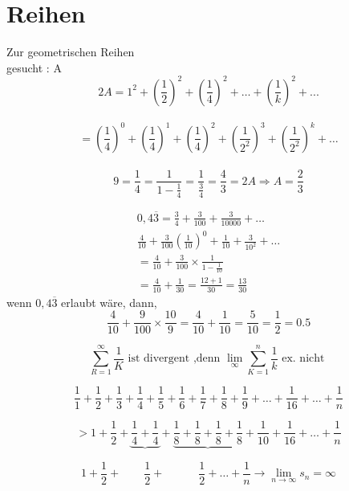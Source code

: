 


\section{Reihen}
\begin{example}{Zur geometrischen Reihen}\\
	gesucht : A
	\[2A = 1^2 + (\frac{1}{2})^2+(\frac{1}{4})^2 + \dots + (\frac{1}{k})^2 + ... \]\\
	\[= (\frac{1}{4})^0 + (\frac{1}{4})^1+ (\frac{1}{4})^2+(\frac{1}{2^2})^3+(\frac{1}{2^2})^k+ \dots \]\\
	\[9 = \frac{1}{4} = \frac{1}{1- \frac{1}{4}} = \frac{1}{\frac{3}{4}} = \frac{4}{3}= 2A \Rightarrow A = \frac{2}{3}\] 
\end{example}

\begin{example}
	\begin{equation}
	\begin{aligned}
	0,4 \overline{3} = \frac{3}{4} + \frac{3}{100} + \frac{3}{10000}+ \dots \\
	\frac{4}{10} + \frac{3}{100}(\frac{1}{10})^0 + \frac{1}{10} + \frac{3}{10^2} + \dots \\
	=\frac{4}{10} + \frac{3}{100} \times \frac{1}{1-\frac{1}{10}}\\
	= \frac{4}{10}+ \frac{1}{30} = \frac{12+1}{30}= \frac{13}{30}
	\end{aligned}
	\end{equation}
	wenn $0,4 \overline{3}$ erlaubt wäre, dann,\\
	\[\frac{4}{10} + \frac{9}{100} \times \frac{10}{9} = \frac{4}{10} + \frac{1}{10} = \frac{5}{10} = \frac{1}{2} = 0.5  \]
\end{example}


\begin{example}
	\[\sum_{R=1}^{\infty} \frac{1}{K} \text{ ist divergent ,denn  } \lim\limits_{\infty} \sum_{K=1}^{n} \frac{1}{k} \text{ ex. nicht } \]
	
	\[\frac{1}{1}+\frac{1}{2}+\frac{1}{3}+\frac{1}{4}+\frac{1}{5}+\frac{1}{6}+\frac{1}{7}+\frac{1}{8}+\frac{1}{9}+\dots+\frac{1}{16}+\dots+\frac{1}{n}\]
	
	\[ > 1+\frac{1}{2}+  \underbrace{\frac{1}{4}+\frac{1}{4}}+\underbrace{\frac{1}{8}+\frac{1}{8}+\frac{1}{8}+\frac{1}{8}}+\frac{1}{10}+\frac{1}{16}+\dots+\frac{1}{n}\] 
	
	\[1+\frac{1}{2} + \qquad \frac{1}{2}+   \quad  \qquad \frac{1}{2}  + \dots + \frac{1}{n}  \rightarrow \lim\limits_{n\rightarrow \infty }s_n = \infty \]
	
\end{example}
